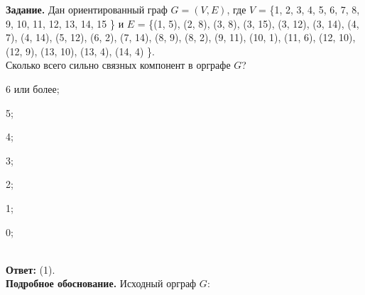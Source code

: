\documentclass{article}
\begin{document}
\pagestyle{empty}


\noindent\textbf{Задание.} Дан ориентированный граф $G = (V, E)$, где
$V$ = \{1, 2, 3, 4, 5, 6, 7, 8, 9, 10, 11, 12, 13, 14, 15 \} и $E$ = \{(1, 5), (2, 8), (3, 8), (3, 15), (3, 12), (3, 14), (4, 7), (4, 14), (5, 12), (6, 2), (7, 14), (8, 9), (8, 2), (9, 11), (10, 1), (11, 6), (12, 10), (12, 9), (13, 10), (13, 4), (14, 4) \}.\\
Сколько всего сильно связных компонент в орграфе $G$?
\vspace{2mm}

\noindent\begin{inparaenum}[(1)]
\item 6 или более;
 \item 5; \item 4; \item 3; \item 2; \item 1; \item 0;\end{inparaenum}\\



\noindent\textbf{Ответ:} (1).\\



\noindent\textbf{Подробное обоснование.}
Исходный орграф $G$:
\vspace{8mm}
\end{document}
